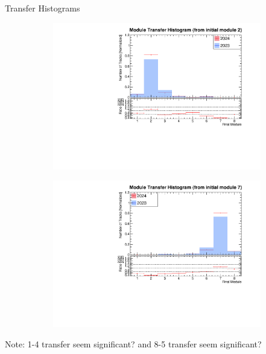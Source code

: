 \begin{frame}{Transfer Histograms}
\begin{figure}
        \begin{subfigure}[t]{0.49\linewidth}
            \includegraphics[width=\linewidth]{./ModuleLevelPlots/final_module_from_st0_module2.pdf}
        \end{subfigure}
        \begin{subfigure}[t]{0.49\linewidth}
            \includegraphics[width=\linewidth]{./ModuleLevelPlots/final_module_from_st0_module7.pdf}
        \end{subfigure}
    \end{figure}
    \vspace{-0.3cm}
    \scriptsize Note: 1-4 transfer seem significant? and 8-5 transfer seem significant?
\end{frame}

